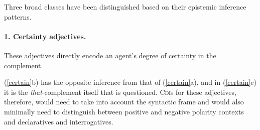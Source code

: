 \documentclass[10pt]{article}
\begin{document}
Three broad classes have been distinguished based on their epistemic inference patterns. 


\vspace{-.2in}
\paragraph{1. Certainty adjectives.} \hspace{-.1in}These adjectives directly encode an agent's degree of certainty in the complement.

\vspace{-0.6em}
 \vspace{-0.6em} 
(\ref{certain}b) has the opposite inference from that of
 (\ref{certain}a), and 
in (\ref{certain}c) it is the
 \textit{that}-complement itself that is questioned. 
C\textsc{di}s for these adjectives, therefore, would need to take into account the syntactic frame and would also minimally need to distinguish between positive and negative polarity contexts and declaratives and interrogatives.
\end{document}
